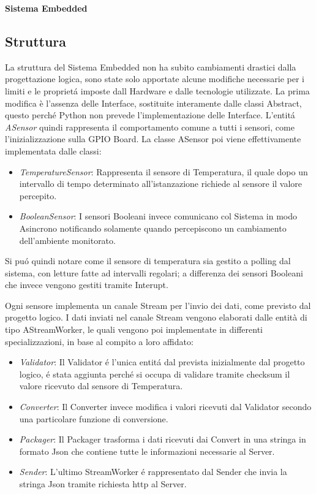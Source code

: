 \newpage

\begin{center}
  \textbf{Sistema Embedded}
\end{center}

\subsection{Struttura}
La struttura del Sistema Embedded non ha subito cambiamenti drastici dalla progettazione logica, sono state solo apportate alcune modifiche necessarie per i limiti e le propriet\'a imposte dall Hardware e dalle tecnologie utilizzate.
La prima modifica è l'assenza delle Interface, sostituite interamente dalle classi Abstract, questo perch\'e Python non prevede l'implementazione delle Interface.
L'entit\'a \textit{ASensor} quindi rappresenta il comportamento comune a tutti i sensori, come l'inizializzazione sulla GPIO Board.
La classe ASensor poi viene effettivamente implementata dalle classi:
\begin{itemize}
\item \textit{TemperatureSensor}: Rappresenta il sensore di Temperatura, il quale dopo un intervallo di tempo determinato all'istanzazione richiede al sensore il valore percepito.
\item \textit{BooleanSensor}: I sensori Booleani invece comunicano col Sistema in modo Asincrono notificando solamente quando percepiscono un cambiamento dell'ambiente monitorato.
\end{itemize}

Si pu\'o quindi notare come il sensore di temperatura sia gestito a polling dal sistema, con letture fatte ad intervalli regolari; a differenza dei sensori Booleani che invece vengono gestiti tramite Interupt.

Ogni sensore implementa un canale Stream per l'invio dei dati, come previsto dal progetto logico.
I dati inviati nel canale Stream vengono elaborati dalle entità di tipo AStreamWorker, le quali vengono poi implementate in differenti specializzazioni, in base al compito a loro affidato:
\begin{itemize}
\item \textit{Validator}: Il Validator \'e l'unica entit\'a dal prevista inizialmente dal progetto logico, \'e stata aggiunta perch\'e si occupa di validare tramite checksum il valore ricevuto dal sensore di Temperatura.
\item \textit{Converter}: Il Converter invece modifica i valori ricevuti dal Validator secondo una particolare funzione di conversione.
\item \textit{Packager}: Il Packager trasforma i dati ricevuti dai Convert in una stringa in formato Json che contiene tutte le informazioni necessarie al Server.
\item \textit{Sender}: L'ultimo StreamWorker \'e rappresentato dal Sender che invia la stringa Json tramite richiesta http al Server.
\end{itemize}

